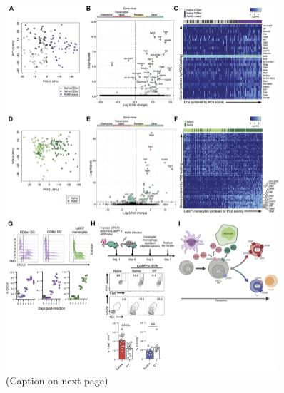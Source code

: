 \begin{figure}[b!]
    \centering
    \includegraphics[width=0.9\textwidth]{"Fig6"}
    \caption[Myeloid cells influence T\textsubscript{H} bifurcation in uncommitted PbTII cells]{(Caption on next page)}
    \label{fig:monocytes}
\end{figure}
\addtocounter{figure}{-1}
